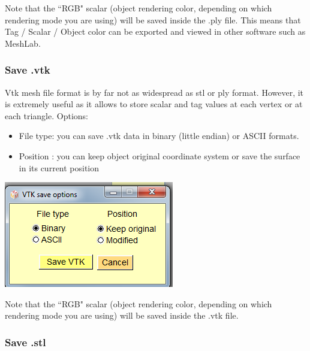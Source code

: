 Note that the ``RGB" scalar (object rendering color, depending on which rendering mode you
are using) will be saved inside the .ply file. This means that Tag / Scalar / Object color can be exported and viewed in other software such as MeshLab.


\subsubsection{Save .vtk}
\begin{minipage}{0.5\textwidth}
Vtk mesh file format is by far not as widespread as stl or ply
format. However, it is extremely useful as it allows to store
scalar and tag values at each vertex or at each triangle.
Options:
\begin{itemize}
\item File type: you can save .vtk data in binary (little endian) or
ASCII formats.

\item Position : you can keep object original coordinate system
or save the surface in its current position
\end{itemize}
\end{minipage}    
\begin{minipage}{0.5\textwidth}\centering
  \includegraphics[scale=0.5]{images/File/Save_vtk.png}
 \end{minipage} 
\noindent
Note that the ``RGB" scalar (object rendering color, depending on which rendering mode you are
using) will be saved inside the .vtk file.


\subsubsection{Save .stl}

